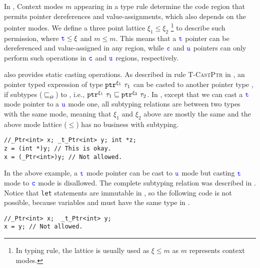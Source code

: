 In \systemname, Context modes $m$ appearing in a type rule determine the code region 
that permits pointer dereferences and value-assignments, which also depends on the pointer modes.
We define a three point lattice $\xi_1 \le \xi_2$ \footnote{In typing rule, the lattice is usually used as $\xi \le m$ as $m$ represents context modes.} to describe such permission, where $\textcolor{blue}{\texttt{t}} \le \xi$ and $m \le m$.
This means that a $\textcolor{blue}{\texttt{t}}$ pointer can be dereferenced and value-assigned in any region, while $\textcolor{blue}{\texttt{c}}$ and $\textcolor{blue}{\texttt{u}}$ pointers can only perform such operations in $\textcolor{blue}{\texttt{c}}$ and $\textcolor{blue}{\texttt{u}}$ regions, respectively.

\systemname also provides static casting operations. As described in rule \textsc{T-CastPtr} in ,
an pointer typed expression of type $\mathtt{ptr}^{\xi_1}~{\tau_1}$ can be casted to another pointer type ,
if  subtypes ($\sqsubseteq_{\Theta}$) to , i.e., $\mathtt{ptr}^{\xi_1}~{\tau_1} \sqsubseteq \mathtt{ptr}^{\xi_2}~{\tau_2}$.
In \systemname, except that we can cast a $\textcolor{blue}{\texttt{t}}$ mode pointer to a $\textcolor{blue}{\texttt{u}}$ mode one, all subtyping relations are between two types with the same mode, meaning that $\xi_1$ and $\xi_2$ above are mostly the same and the above mode lattice ($\le$) has no business with subtyping.

\begin{verbatim}
//_Ptr<int> x; _t_Ptr<int> y; int *z;
z = (int *)y; // This is okay.
x = (_Ptr<int>)y; // Not allowed.
\end{verbatim}

In the above example, a $\textcolor{blue}{\texttt{t}}$ mode pointer can be cast to $\textcolor{blue}{\texttt{u}}$ mode but casting $\textcolor{blue}{\texttt{t}}$ mode to $\textcolor{blue}{\texttt{c}}$ mode is disallowed.
The complete subtyping relation was described in .
Notice that \texttt{let} statements are immutable in \systemname, so the following code is not possible, because variables  and  must have the same type in \systemname.

\begin{verbatim}
//_Ptr<int> x;  _t_Ptr<int> y;
x = y; // Not allowed.
\end{verbatim}

